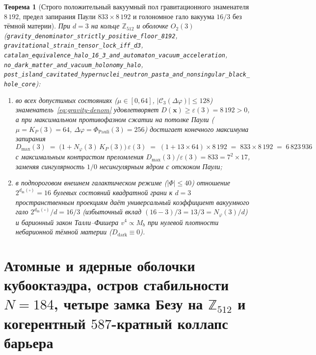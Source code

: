 \documentclass[11pt,a4paper]{article}
\theoremstyle{plain}
\newtheorem{theorem}{Теорема}[section]
\theoremstyle{definition}
\begin{document}
\begin{theorem}[Строго положительный вакуумный пол гравитационного знаменателя $8\,192$, предел запирания Паули $833\times 8\,192$ и голономное гало вакуума $16/3$ без тёмной материи]
\label{thm:gravity-halo}
При $d=3$ на кольце $\mathbb{Z}_{512}$ и оболочке $O_2(3)$ (\texttt{gravity\_denominator\_strictly\_positive\_floor\_8192}, \texttt{gravitational\_strain\_tensor\_lock\_iff\_d3}, \texttt{catalan\_equivalence\_halo\_16\_3\_and\_automaton\_vacuum\_acceleration}, \texttt{no\_dark\_matter\_and\_vacuum\_holonomy\_halo}, \texttt{post\_island\_cavitated\_hypernuclei\_neutron\_pasta\_and\_nonsingular\_black\_hole\_core}):
\begin{enumerate}[label=\textbf{(\roman*)},leftmargin=*]
\item во всех допустимых состояниях ($\mu\in[0,64]$, $|\mathcal{C}_3(\Delta\varphi)|\le 128$) знаменатель~\eqref{eq:gravity-denom} удовлетворяет $D(\mathbf{x}) \ge \varepsilon(3) = 8\,192 > 0$, а при максимальном противофазном сжатии на потолке Паули ($\mu = K_P(3) = 64$, $\Delta\varphi = \Phi_{\mathrm{Pauli}}(3) = 256$) достигает конечного максимума запирания
  \begin{equation}
    \label{eq:pauli-max-833}
    D_{\max}(3) \;=\; \bigl(1 + N_\varphi(3)\,K_P(3)\bigr)\,\varepsilon(3) \;=\; (1 + 13\times 64)\times 8\,192 \;=\; 833\times 8\,192 \;=\; 6\,823\,936
  \end{equation}
  с максимальным контрастом преломления $D_{\max}(3)/\varepsilon(3) = 833 = 7^2\times 17$, заменяя сингулярность $1/0$ несингулярным ядром с отскоком Паули;
\item в подпороговом внешнем галактическом режиме ($|\Phi|\le 40$) отношение $2^{d_{\mathrm{in}}(\square)} = 16$ булевых состояний квадратной грани к $d=3$ пространственным проекциям даёт универсальный коэффициент вакуумного гало $2^{d_{\mathrm{in}}(\square)}/d = 16/3$ (избыточный вклад $(16-3)/3 = 13/3 = N_\varphi(3)/d$) и барионный закон Талли--Фишера $v^4\propto M_b$ при нулевой плотности небарионной тёмной материи ($D_{\mathrm{dark}}\equiv 0$).
\end{enumerate}
\end{theorem}

\section{Атомные и ядерные оболочки кубооктаэдра, остров стабильности \texorpdfstring{$N=184$}{N=184}, четыре замка Безу на \texorpdfstring{$\mathbb{Z}_{512}$}{Z512} и когерентный \texorpdfstring{$587$}{587}-кратный коллапс барьера}
\label{sec:nuclear-587}
\end{document}
